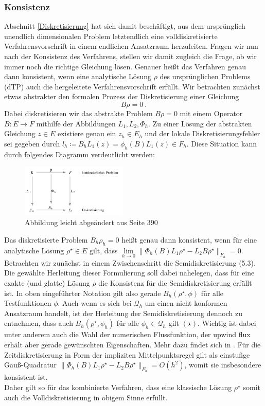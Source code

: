 \subsubsection{Konsistenz}
	 Abschnitt \ref{Diskretisierung} hat sich damit beschäftigt, aus dem ursprünglich unendlich dimensionalen Problem letztendlich eine volldiskretisierte Verfahrensvorschrift in einem endlichen Ansatzraum herzuleiten. Fragen wir nun nach der Konsistenz des Verfahrens, stellen wir damit zugleich die Frage, ob wir immer noch die richtige Gleichung lösen. Genauer heißt das Verfahren genau dann konsistent, wenn eine analytische Lösung $ \rho $ des ursprünglichen Problems (dTP) auch die hergeleitete Verfahrensvorschrift erfüllt. 
	 Wir betrachten zunächst etwas abstrakter den formalen Prozess der Diskretisierung einer Gleichung \[ B \rho=0 \ .  \]
	 Dabei diskretisieren wir das abstrakte Problem $ B \rho=0 $ mit einem Operator $ B \colon E \to F $ mithilfe der Abbildungen $ L_1,L_2,\Phi_h $.
	 Zu einer Lösung der abstrakten Gleichung $ z \in E $ existiere genau ein $ z_h \in E_h$ und der lokale Diskretisierungsfehler sei gegeben durch $
	 l_h \coloneqq B_h L_1(z) = \phi_h(B) L_1(z) \in F_h 
	 $. Diese Situation kann durch folgendes Diagramm verdeutlicht werden:
	 \begin{figure}[H]
	 	\centering
	 	\includegraphics[width=0.45\textwidth]{abstraktkonsistenz2.png} \\
	 	Abbildung leicht abgeändert aus \cite{brokate2016grundwissen} Seite 390
	 \end{figure}
	 Das diskretisierte Problem $ B_h \rho_h = 0  $ heißt genau dann konsistent, wenn für eine analytische Lösung $ \rho^{\star} \in E $ gilt, dass $ \lim\limits_{h \to 0}\lVert \Phi_h(B)L_1\rho^{\star} - L_2B\rho^{\star} \rVert_{F_h} = 0 $.
	 Betrachten wir zunächst in einem Zwischenschritt die Semidiskretisierung (5.3).
	 Die gewählte Herleitung dieser Formulierung soll dabei nahelegen, dass für eine exakte (und glatte) Lösung $ \rho $ die Konsistenz für die Semidiskretisierung erfüllt ist. In oben eingeführter Notation gilt also gerade $ B_h(\rho^{\star},\phi) $ für alle Testfunktionen $ \phi $. Auch wenn es sich bei $ \mathcal{Q}_h $ um einen nicht konformen Ansatzraum handelt, ist der Herleitung der Semidiskretisierung dennoch zu entnehmen, dass auch $ B_h(\rho^{\star},\phi_h) $ für alle $ \phi_h \in \mathcal{Q}_h $ gilt $(\star)$.  Wichtig ist dabei unter anderem auch die Wahl der numerischen Flussfunktion, der upwind flux erhält aber gerade gewünschten Eigenschaften. 
	 Mehr dazu findet sich in \cite{Har08b}.
	 Für die Zeitdiskretisierung in Form der impliziten Mittelpunktsregel gilt als einstufige Gauß-Quadratur $ \lVert \Phi_h(B)L_1\rho^{\star} - L_2B\rho^{\star} \rVert_{F_h} = O(h^2)$, womit sie insbesondere konsistent ist. \\
	 Daher gilt so für das kombinierte Verfahren, dass eine klassische Lösung $ \rho^{\star} $ somit auch die Volldiskretisierung in obigem Sinne erfüllt. 
